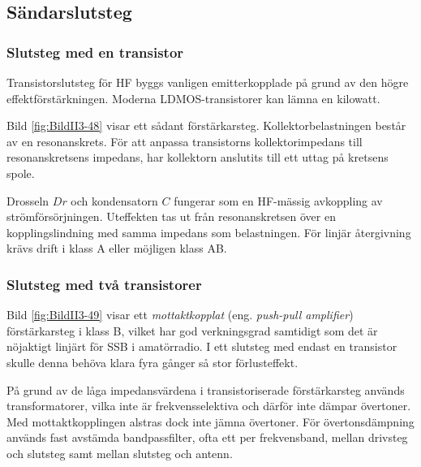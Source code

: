 \subsection{Sändarslutsteg}

\subsubsection{Slutsteg med en transistor}


Transistorslutsteg för HF byggs vanligen emitterkopplade på grund av den
högre effektförstärkningen.
Moderna LDMOS-transistorer kan lämna en kilowatt.

Bild \ref{fig:BildII3-48} visar ett sådant förstärkarsteg.
Kollektorbelastningen består av en resonanskrets.
För att anpassa transistorns kollektorimpedans till resonanskretsens
impedans, har kollektorn anslutits till ett uttag på kretsens spole.

Drosseln \(Dr\) och kondensatorn \(C\) fungerar som en HF-mässig avkoppling av
strömförsörjningen.
Uteffekten tas ut från resonanskretsen över en kopplingslindning med samma
impedans som belastningen.
För linjär återgivning krävs drift i klass A eller möjligen klass AB.

\subsubsection{Slutsteg med två transistorer}


Bild \ref{fig:BildII3-49} visar ett \emph{mottaktkopplat} (eng.
\emph{push-pull amplifier}) förstärkarsteg i klass B, vilket har god verkningsgrad
samtidigt som det är nöjaktigt linjärt för SSB i amatörradio.
I ett slutsteg med endast en transistor skulle denna behöva klara fyra gånger
så stor förlusteffekt.

På grund av de låga impedansvärdena i transistoriserade förstärkarsteg används
transformatorer, vilka inte är frekvensselektiva och därför inte dämpar
övertoner.
Med mottaktkopplingen alstras dock inte jämna övertoner.
För övertonsdämpning används fast avstämda bandpassfilter, ofta ett per
frekvensband, mellan drivsteg och slutsteg samt mellan slutsteg och antenn.

